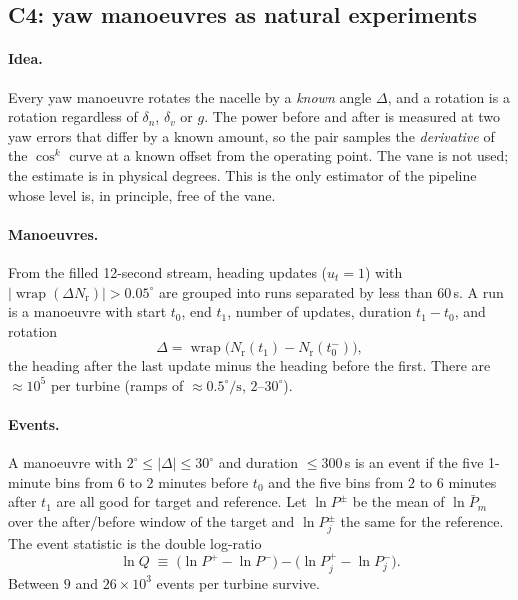 \documentclass[11pt,a4paper]{article}
\theoremstyle{remark}
\newcommand{\wrap}{\operatorname{wrap}}
\newcommand{\dg}{^{\circ}}
\newcommand{\Nr}{N_{\mathrm{r}}}
\begin{document}
\subsection{C4: yaw manoeuvres as natural experiments}\label{sec:c4}

\paragraph{Idea.} Every yaw manoeuvre rotates the nacelle by a \emph{known}
angle $\Delta$, and a rotation is a rotation regardless of $\delta_n$,
$\delta_v$ or $g$. The power before and after is measured at two yaw errors that
differ by a known amount, so the pair samples the \emph{derivative} of the
$\cos^k$ curve at a known offset from the operating point. The vane is not used;
the estimate is in physical degrees. This is the only estimator of the pipeline
whose level is, in principle, free of the vane.

\paragraph{Manoeuvres.} From the filled 12-second stream, heading updates
($u_t=1$) with $|\wrap(\Delta\Nr)|>0.05\dg$ are grouped into runs separated by
less than $60$\,s. A run is a manoeuvre with start $t_0$, end $t_1$, number of
updates, duration $t_1-t_0$, and rotation
\begin{equation}
  \Delta = \wrap\big(\Nr(t_1) - \Nr(t_0^-)\big),
\end{equation}
the heading after the last update minus the heading before the first. There are
$\approx10^5$ per turbine (ramps of $\approx0.5\dg/\mathrm{s}$, $2$--$30\dg$).

\paragraph{Events.} A manoeuvre with $2\dg\le|\Delta|\le30\dg$ and duration
$\le300$\,s is an event if the five 1-minute bins from $6$ to $2$ minutes before
$t_0$ and the five bins from $2$ to $6$ minutes after $t_1$ are all good for
target and reference. Let $\ln P^{\pm}$ be the mean of $\ln\bar P_m$ over the
after/before window of the target and $\ln P^{\pm}_j$ the same for the reference.
The event statistic is the double log-ratio
\begin{equation}
  \ln Q \;\equiv\; \big(\ln P^+ - \ln P^-\big) - \big(\ln P^+_j - \ln P^-_j\big) .
  \label{eq:lnQ}
\end{equation}
Between $9$ and $26\times10^3$ events per turbine survive.
\end{document}
